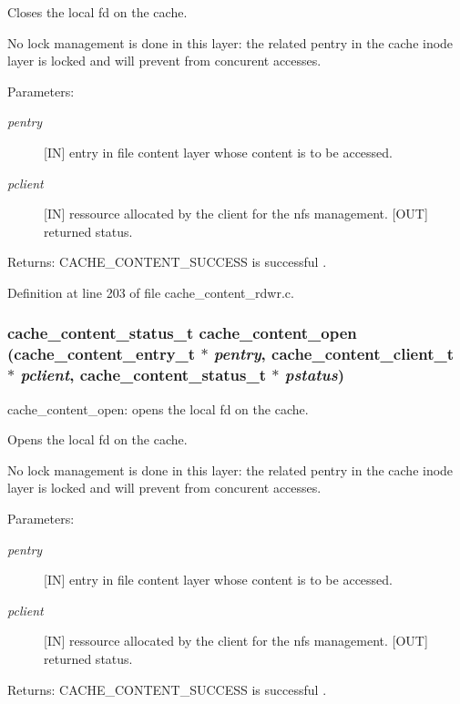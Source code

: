 Closes the local fd on the cache.

No lock management is done in this layer: the related pentry in the cache inode layer is locked and will prevent from concurent accesses.

\begin{Desc}
\item[Parameters:]
\begin{description}
\item[{\em pentry}][IN] entry in file content layer whose content is to be accessed. \item[{\em pclient}][IN] ressource allocated by the client for the nfs management.  [OUT] returned status.\end{description}
\end{Desc}
\begin{Desc}
\item[Returns:]CACHE\_\-CONTENT\_\-SUCCESS is successful . \end{Desc}


Definition at line 203 of file cache\_\-content\_\-rdwr.c.
\subsubsection[{cache\_\-content\_\-open}]{\setlength{\rightskip}{0pt plus 5cm}cache\_\-content\_\-status\_\-t cache\_\-content\_\-open (cache\_\-content\_\-entry\_\-t $\ast$ {\em pentry}, \/  cache\_\-content\_\-client\_\-t $\ast$ {\em pclient}, \/  cache\_\-content\_\-status\_\-t $\ast$ {\em pstatus})}\label{cache__content__rdwr_8c_f2c11cf4d5c20af4947042448d97a9d8}


cache\_\-content\_\-open: opens the local fd on the cache.

Opens the local fd on the cache.

No lock management is done in this layer: the related pentry in the cache inode layer is locked and will prevent from concurent accesses.

\begin{Desc}
\item[Parameters:]
\begin{description}
\item[{\em pentry}][IN] entry in file content layer whose content is to be accessed. \item[{\em pclient}][IN] ressource allocated by the client for the nfs management.  [OUT] returned status.\end{description}
\end{Desc}
\begin{Desc}
\item[Returns:]CACHE\_\-CONTENT\_\-SUCCESS is successful . \end{Desc}


